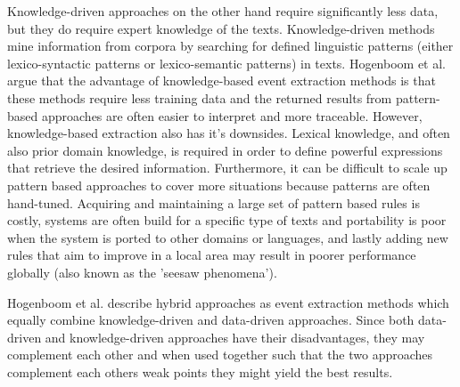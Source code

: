 \documentclass[a4paper, 10pt, conference]{ieeeconf}      %
\begin{document}
Knowledge-driven approaches on the other hand require significantly less data, but they do require expert knowledge of the texts. Knowledge-driven methods mine information from corpora by searching for defined linguistic patterns (either lexico-syntactic patterns or lexico-semantic patterns) in texts. Hogenboom et al. argue that the advantage of knowledge-based event extraction methods is that these methods require less training data and the returned results from pattern-based approaches are often easier to interpret and more traceable. However, knowledge-based extraction also has it's downsides. Lexical knowledge, and often also prior domain knowledge, is required in order to define powerful expressions that retrieve the desired information. Furthermore, it can be difficult to scale up pattern based approaches to cover more situations because patterns are often hand-tuned. Acquiring and maintaining a large set of pattern based rules is costly, systems are often build for a specific type of texts and portability is poor when the system is ported to other domains or languages, and lastly adding new rules that aim to improve in a local area may result in poorer performance globally (also known as the 'seesaw phenomena')\cite{su1996overviewCBSO}.

Hogenboom et al. describe hybrid approaches as event extraction methods which equally combine knowledge-driven and data-driven approaches. Since both data-driven and knowledge-driven approaches have their disadvantages, they may complement each other and when used together such that the two approaches complement each others weak points they might yield the best results.

\end{document}
